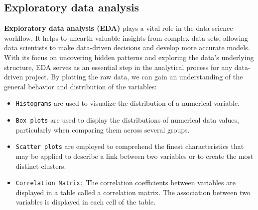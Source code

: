\documentclass[a4paper]{article}
\theoremstyle{definition}
\begin{document}
\subsection{Exploratory data analysis}
\textbf{Exploratory data analysis (EDA)} plays a vital role in the data science workflow. It helps to unearth valuable insights from complex data sets, allowing data scientists to make data-driven decisions and develop more accurate models. With its focus on uncovering hidden patterns and exploring the data's underlying structure, EDA serves as an essential step in the analytical process for any data-driven project. By plotting the raw data, we can gain an understanding of the general behavior and distribution of the variables:
\begin{itemize}
    \item \verb|Histograms| are used to visualize the distribution of a numerical variable.
    \item \verb|Box plots| are used to display the distributions of numerical data values, particularly when comparing them across several groups.
    \item \verb|Scatter plots| are employed to comprehend the finest characteristics that may be applied to describe a link between two variables or to create the most distinct clusters.
    \item \verb|Correlation Matrix:| The correlation coefficients between variables are displayed in a table called a correlation matrix. The association between two variables is displayed in each cell of the table.
\end{itemize}
\end{document}
